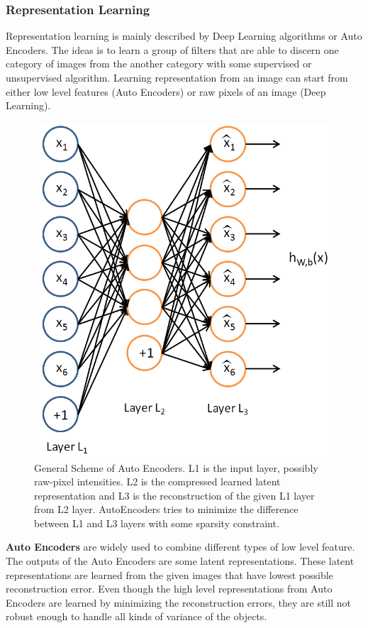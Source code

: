 \subsubsection{Representation Learning}
Representation learning is mainly described by Deep Learning 
algorithms or Auto Encoders. The ideas is to learn a group of filters that are able to discern one category of images from the another category with some supervised or unsupervised algorithm. 
Learning representation from an image can start from either low level features (Auto Encoders) or raw pixels of an image (Deep Learning).
\begin{figure}
	\centering
	\includegraphics[scale=.3]{introduction/fig/sparsecoding.png}
	\caption{General Scheme of Auto Encoders. L1 is the input layer, possibly raw-pixel intensities. L2 is the compressed learned latent representation and L3 is the reconstruction of the given L1 layer from L2 layer. AutoEncoders tries to minimize the difference between L1 and L3 layers with some sparsity constraint.}\label{fig:intro:sparse}
\end{figure}

\textbf{Auto Encoders} are widely used to combine different types of low level feature. The outputs of the Auto Encoders are some latent representations. These latent representations are learned from the given images that have lowest possible reconstruction error. Even though the high level representations from Auto Encoders are learned by minimizing the reconstruction errors, they are still not robust enough to handle all kinds of variance of the objects.

